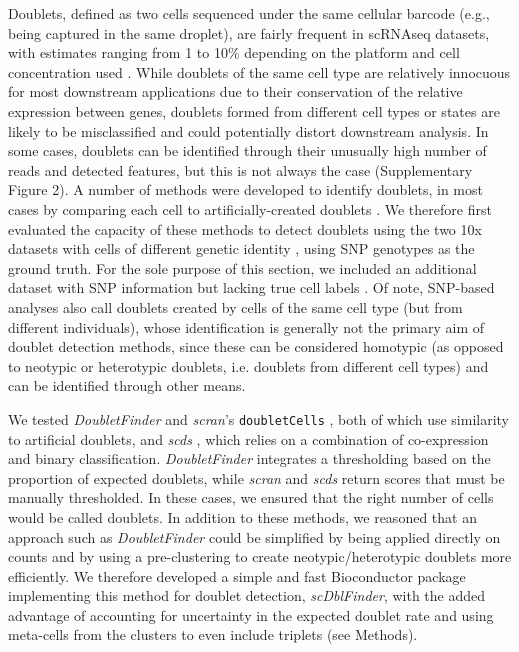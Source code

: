\documentclass{bmcart}
\begin{document}
Doublets, defined as two cells sequenced under the same cellular barcode (e.g., being captured in the same droplet), are fairly frequent in scRNAseq datasets, with estimates ranging from 1 to 10\% depending on the platform and cell concentration used \citep{bloomEstimating2018,kangMultiplexedDemuxlet2018}. While doublets of the same cell type are relatively innocuous for most downstream applications due to their conservation of the relative expression between genes, doublets formed from different cell types or states are likely to be misclassified and could potentially distort downstream analysis. In some cases, doublets can be identified through their unusually high number of reads and detected features, but this is not always the case (Supplementary Figure 2). A number of methods were developed to identify doublets, in most cases by comparing each cell to artificially-created doublets \citep{mcginnisDoubletfinder2019, LunScran2016, BaisScds2019}. We therefore first evaluated the capacity of these methods to detect doublets using the two 10x datasets with cells of different genetic identity \citep{tianMixology2018}, using SNP genotypes as the ground truth. For the sole purpose of this section, we included an additional dataset with SNP information but lacking true cell labels \citep{kangMultiplexedDemuxlet2018}. Of note, SNP-based analyses also call doublets created by cells of the same cell type (but from different individuals), whose identification is generally not the primary aim of doublet detection methods, since these can be considered homotypic (as opposed to neotypic or heterotypic doublets, i.e. doublets from different cell types) and can be identified through other means.

We tested \textit{DoubletFinder} \citep{mcginnisDoubletfinder2019} and \textit{scran}'s \texttt{doubletCells} \citep{LunScran2016}, both of which use similarity to artificial doublets, and \textit{scds} \citep{BaisScds2019}, which relies on a combination of co-expression and binary classification. \textit{DoubletFinder} integrates a thresholding based on the proportion of expected doublets, while \textit{scran} and \textit{scds} return scores that must be manually thresholded. In these cases, we ensured that the right number of cells would be called doublets. In addition to these methods, we reasoned that an approach such as \textit{DoubletFinder} could be simplified by being applied directly on counts and by using a pre-clustering to create neotypic/heterotypic doublets more efficiently. We therefore developed a simple and fast Bioconductor package implementing this method for doublet detection, \textit{scDblFinder}, with the added advantage of accounting for uncertainty in the expected doublet rate and using meta-cells from the clusters to even include triplets (see Methods).
\end{document}
